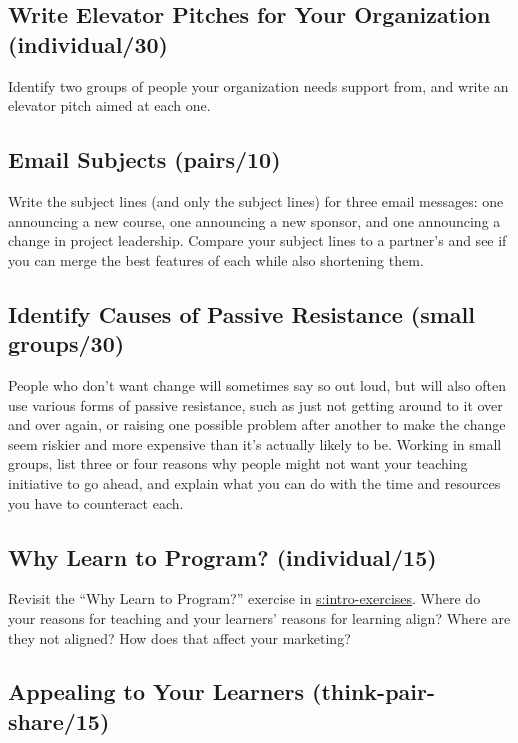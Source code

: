 \subsection{Write Elevator Pitches for Your Organization (individual/30)}\label{write-elevator-pitches-for-your-organization-individual30}

Identify two groups of people your organization needs support from, and
write an elevator pitch aimed at each one.

\subsection{Email Subjects (pairs/10)}\label{email-subjects-pairs10}

Write the subject lines (and only the subject lines) for three email
messages: one announcing a new course, one announcing a new sponsor, and
one announcing a change in project leadership. Compare your subject
lines to a partner's and see if you can merge the best features of each
while also shortening them.

\subsection{Identify Causes of Passive Resistance (small groups/30)}\label{identify-causes-of-passive-resistance-small-groups30}

People who don't want change will sometimes say so out loud, but will
also often use various forms of passive resistance, such as just not
getting around to it over and over again, or raising one possible
problem after another to make the change seem riskier and more expensive
than it's actually likely to be. Working in small groups, list three or
four reasons why people might not want your teaching initiative to go
ahead, and explain what you can do with the time and resources you have
to counteract each.

\subsection{Why Learn to Program? (individual/15)}\label{why-learn-to-program-individual15}

Revisit the ``Why Learn to Program?'' exercise in
\protect\hyperlink{SECTION}{s:intro-exercises}. Where do your reasons for teaching and
your learners' reasons for learning align? Where are they not aligned?
How does that affect your marketing?

\subsection{Appealing to Your Learners (think-pair-share/15)}\label{appealing-to-your-learners-think-pair-share15}

